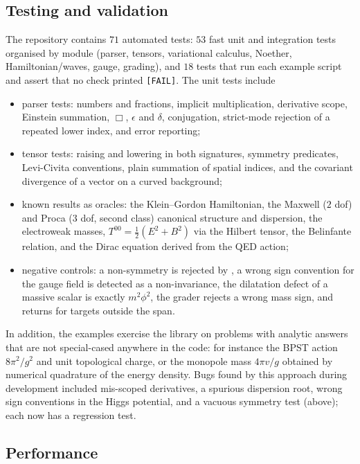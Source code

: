 \subsection{Testing and validation}
\label{sec:testing}

The repository contains $71$ automated tests: $53$ fast unit and integration tests organised by module (parser, tensors, variational calculus, Noether, Hamiltonian/waves, gauge, grading), and $18$ tests that run each example script and assert that no check printed \texttt{[FAIL]}. The unit tests include
\begin{itemize}[nosep]
\item parser tests: numbers and fractions, implicit multiplication, derivative scope, Einstein summation, $\Box$, $\epsilon$ and $\delta$, conjugation, strict-mode rejection of a repeated lower index, and error reporting;
\item tensor tests: raising and lowering in both signatures, symmetry predicates, Levi-Civita conventions, plain summation of spatial indices, and the covariant divergence of a vector on a curved background;
\item known results as oracles: the Klein--Gordon Hamiltonian, the Maxwell ($2$ dof) and Proca ($3$ dof, second class) canonical structure and dispersion, the electroweak masses, $T^{00}=\tfrac12(E^2+B^2)$ via the Hilbert tensor, the Belinfante relation, and the Dirac equation derived from the QED action;
\item negative controls: a non-symmetry is rejected by , a wrong sign convention for the gauge field is detected as a non-invariance, the dilatation defect of a massive scalar is exactly $m^2\phi^2$, the grader rejects a wrong mass sign, and  returns  for targets outside the span.
\end{itemize}
In addition, the examples exercise the library on problems with analytic answers that are not special-cased anywhere in the code: for instance the BPST action $8\pi^2/g^2$ and unit topological charge, or the monopole mass $4\pi v/g$ obtained by numerical quadrature of the energy density. Bugs found by this approach during development included mis-scoped derivatives, a spurious dispersion root, wrong sign conventions in the Higgs potential, and a vacuous symmetry test (above); each now has a regression test.

\subsection{Performance}
\label{sec:perf}

